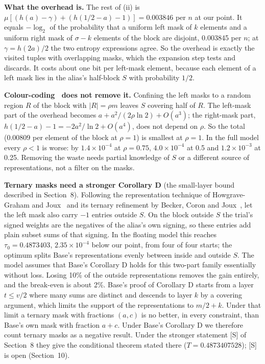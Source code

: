 \documentclass[11pt]{article}
\theoremstyle{plain}
\begin{document}
\textbf{What the overhead is.} The rest of (ii) is $\mu[(h(a) - \gamma) + (h(1/2 - a) - 1)] = 0.003846$ per $n$ at our point. It equals $-\log_2$ of the probability that a uniform left mask of $k$ elements and a uniform right mask of $\sigma - k$ elements of the block are disjoint, 0.003845 per $n$; at $\gamma = h(2a)/2$ the two entropy expressions agree. So the overhead is exactly the visited tuples with overlapping masks, which the expansion step tests and discards. It costs about one bit per left-mask element, because each element of a left mask lies in the alias's half-block $S$ with probability $1/2$.

\textbf{Colour-coding~\cite{ayz} does not remove it.} Confining the left masks to a random region $R$ of the block with $|R| = \rho m$ leaves $S$ covering half of $R$. The left-mask part of the overhead becomes $a + a^2/(2\rho \ln 2) + O(a^3)$; the right-mask part, $h(1/2 - a) - 1 = -2a^2/\ln 2 + O(a^4)$, does not depend on $\rho$. So the total (0.00809 per element of the block at $\rho = 1$) is smallest at $\rho = 1$. In the full model every $\rho < 1$ is worse: by $1.4\times10^{-4}$ at $\rho = 0.75$, $4.0\times10^{-4}$ at 0.5 and $1.2\times10^{-3}$ at 0.25. Removing the waste needs partial knowledge of $S$ or a different source of representations, not a filter on the masks.

\textbf{Ternary masks need a stronger Corollary D} (the small-layer bound described in Section~8). Following the representation technique of Howgrave-Graham and Joux~\cite{hgj} and its ternary refinement by Becker, Coron and Joux~\cite{bcj}, let the left mask also carry $-1$ entries outside $S$. On the block outside $S$ the trial's signed weights are the negatives of the alias's own signing, so these entries add plain subset sums of that signing. In the floating model this reaches $\tau_0 = 0.4873403$, $2.35\times10^{-4}$ below our point, from four of four starts; the optimum splits Base's representations evenly between inside and outside $S$. The model assumes that Base's Corollary D holds for this two-part family essentially without loss. Losing 10\% of the outside representations removes the gain entirely, and the break-even is about 2\%. Base's proof of Corollary D starts from a layer $t \le v/2$ where many sums are distinct and descends to layer $k$ by a covering argument, which limits the support of the representations to $m/2 + k$. Under that limit a ternary mask with fractions $(a, c)$ is no better, in every constraint, than Base's own mask with fraction $a + c$. Under Base's Corollary D we therefore count ternary masks as a negative result. Under the stronger statement [S] of Section~8 they give the conditional theorem stated there ($T = 0.4873407528$); [S] is open (Section~10).
\end{document}
